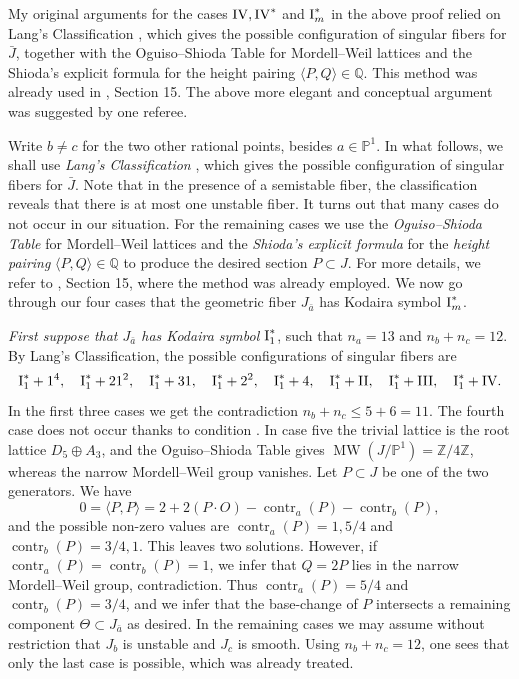 \documentclass[oneside, 12pt]{amsart}
\theoremstyle{definition}
\theoremstyle{remark}
\newcommand{\ZZ}{\mathbb{Z}}
\newcommand{\QQ}{\mathbb{Q}}
\newcommand{\PP}{\mathbb{P}}
\newcommand{\contr}{\operatorname{contr}}
\newcommand{\I}{\text{\rm I}}
\newcommand{\II}{\text{\rm II}}
\newcommand{\III}{\text{\rm III}}
\newcommand{\IV}{\text{\rm IV}}
\newcommand{\MW}{\operatorname{MW}}
\newcommand{\bJ}{{\bar{J}}}
\newcommand{\ba}{{\bar{a}}}
\begin{document}
\medskip
My original arguments for the cases $\IV,\IV^*$ and $\I_m^*$ in the above proof relied on Lang's Classification \cite{Lang 2000}, 
which gives the possible  configuration of singular fibers for
$\bJ$, together with the  Oguiso--Shioda Table \cite{Oguiso; Shioda 1991}  for Mordell--Weil lattices 
and the Shioda's explicit formula \cite{Shioda 1990} for the height pairing $\langle P,Q\rangle\in\QQ$.
This  method was already used in \cite{Schroeer 2021a}, Section 15. The above more elegant
and conceptual argument was suggested by one referee.


\iffalse
Write  $b\neq c$ for the two other rational points, besides $a\in\PP^1$.
In what follows, we shall use   \emph{Lang's Classification} \cite{Lang 2000}, 
which gives the possible  configuration of singular fibers for
$\bJ$. Note that in the presence of a semistable fiber, the classification reveals that there is at most one unstable fiber.
It turns out that many cases do not occur in our situation.
For the remaining cases we use the  \emph{Oguiso--Shioda Table} \cite{Oguiso; Shioda 1991}  for Mordell--Weil lattices 
and the \emph{Shioda's explicit formula} \cite{Shioda 1990} for the \emph{height pairing} $\langle P,Q\rangle\in\QQ$  to produce
the desired section $P\subset J$.  For more details, we refer to \cite{Schroeer 2021a}, Section 15,
where the method was already employed. We now go through our four cases that the geometric fiber $J_\ba$ has Kodaira symbol
$\I_m^*$.
 
\emph{First suppose that $J_\ba$ has Kodaira symbol $\I_1^*$}, such that $n_a=13$ and $n_b+n_c=12$. By Lang's Classification,
the possible configurations of singular fibers are
$$
\I_1^*+1^4,\quad \I^*_1+21^2,\quad \I_1^*+31,\quad \I_1^*+2^2,\quad \I_1^*+4,\quad \I_1^*+\II,\quad\I_1^*+\III,\quad\I_1^*+\IV.
$$
In the first three cases we get the contradiction $n_b+n_c\leq 5+6=11$.
The fourth case does not occur thanks to condition .
In case five the trivial lattice is the root lattice $D_5\oplus A_3$, and the Oguiso--Shioda Table gives
$\MW(J/\PP^1)=\ZZ/4\ZZ$, whereas the narrow Mordell--Weil group vanishes. Let $P\subset J$ be one of the two generators.
We have
$$
0=\langle P,P\rangle = 2+2(P\cdot O) -\contr_a(P)-\contr_b(P),
$$
and the possible non-zero values are $\contr_a(P)=1,5/4$ and $\contr_b(P)=3/4,1$.
This leaves two solutions. However, if $\contr_a(P)=\contr_b(P)=1$,
we infer that $Q=2P$ lies in the narrow Mordell--Weil group, contradiction.
Thus $\contr_a(P)=5/4$ and $\contr_b(P)=3/4$, and we infer that the base-change of $P$ intersects 
a remaining component $\Theta\subset J_\ba$ as desired.
In the remaining cases we may assume without restriction that $J_b$ is unstable and $J_c$ is smooth.
Using $n_b+n_c=12$, one sees that only the last case is possible, which was already treated.
\end{document}
